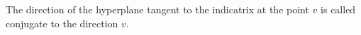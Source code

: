 The direction of the hyperplane tangent to the indicatrix at the point $v$ is called conjugate to the direction $v$.
